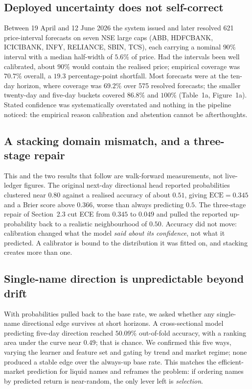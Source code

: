 \documentclass[12pt,a4paper]{article}
\begin{document}
\subsection{Deployed uncertainty does not self-correct}

Between 19 April and 12 June 2026 the system issued and later resolved 621
price-interval forecasts on seven NSE large caps (ABB, HDFCBANK, ICICIBANK, INFY,
RELIANCE, SBIN, TCS), each carrying a nominal $90\%$ interval with a median
half-width of $5.6\%$ of price. Had the intervals been well calibrated, about $90\%$
would contain the realised price; empirical coverage was $70.7\%$ overall, a $19.3$
percentage-point shortfall. Most forecasts were at the ten-day horizon, where
coverage was $69.2\%$ over 575 resolved forecasts; the smaller twenty-day and
five-day buckets covered $86.8\%$ and $100\%$ (Table~1a, Figure~1a). Stated confidence
was systematically overstated and nothing in the pipeline noticed: the empirical
reason calibration and abstention cannot be afterthoughts.

\subsection{A stacking domain mismatch, and a three-stage repair}

This and the two results that follow are walk-forward measurements, not live-ledger
figures. The original next-day directional head reported probabilities clustered
near $0.80$ against a realised accuracy of about $0.51$, giving
$\mathrm{ECE}=0.345$ and a Brier score above $0.366$, worse than always predicting
$0.5$. The three-stage repair of Section~2.3 cut ECE from $0.345$ to $0.049$ and
pulled the reported up-probability back to a realistic neighbourhood of $0.50$.
Accuracy did not move: calibration changed what the model \emph{said about its
confidence}, not what it predicted. A calibrator is bound to the distribution it was
fitted on, and stacking creates more than one.

\subsection{Single-name direction is unpredictable beyond drift}

With probabilities pulled back to the base rate, we asked whether any single-name
directional edge survives at short horizons. A cross-sectional model predicting
five-day direction reached $50.09\%$ out-of-fold accuracy, with a ranking area under
the curve near $0.49$; that is chance. We confirmed this five ways, varying the
learner and feature set and gating by trend and market regime; none produced a
stable edge over the always-up base rate. This matches the efficient-market
prediction for liquid names \cite{fama1970} and reframes the problem: if ordering
names by predicted return is near-random, the only lever left is \emph{selection}.
\end{document}
